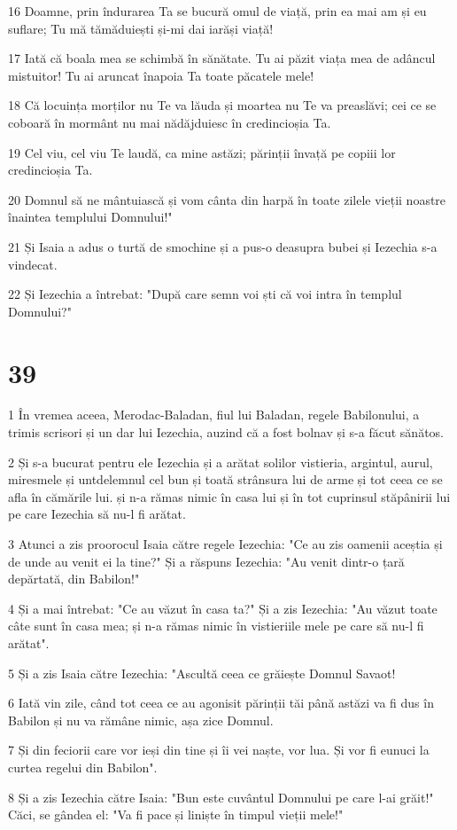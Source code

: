 \par 16 Doamne, prin îndurarea Ta se bucură omul de viață, prin ea mai am și eu suflare; Tu mă tămăduiești și-mi dai iarăși viață!
\par 17 Iată că boala mea se schimbă în sănătate. Tu ai păzit viața mea de adâncul mistuitor! Tu ai aruncat înapoia Ta toate păcatele mele!
\par 18 Că locuința morților nu Te va lăuda și moartea nu Te va preaslăvi; cei ce se coboară în mormânt nu mai nădăjduiesc în credincioșia Ta.
\par 19 Cel viu, cel viu Te laudă, ca mine astăzi; părinții învață pe copiii lor credincioșia Ta.
\par 20 Domnul să ne mântuiască și vom cânta din harpă în toate zilele vieții noastre înaintea templului Domnului!"
\par 21 Și Isaia a adus o turtă de smochine și a pus-o deasupra bubei și Iezechia s-a vindecat.
\par 22 Și Iezechia a întrebat: "După care semn voi ști că voi intra în templul Domnului?"

\chapter{39}

\par 1 În vremea aceea, Merodac-Baladan, fiul lui Baladan, regele Babilonului, a trimis scrisori și un dar lui Iezechia, auzind că a fost bolnav și s-a făcut sănătos.
\par 2 Și s-a bucurat pentru ele Iezechia și a arătat solilor vistieria, argintul, aurul, miresmele și untdelemnul cel bun și toată strânsura lui de arme și tot ceea ce se afla în cămările lui. și n-a rămas nimic în casa lui și în tot cuprinsul stăpânirii lui pe care Iezechia să nu-l fi arătat.
\par 3 Atunci a zis proorocul Isaia către regele Iezechia: "Ce au zis oamenii aceștia și de unde au venit ei la tine?" Și a răspuns Iezechia: "Au venit dintr-o țară depărtată, din Babilon!"
\par 4 Și a mai întrebat: "Ce au văzut în casa ta?" Și a zis Iezechia: "Au văzut toate câte sunt în casa mea; și n-a rămas nimic în vistieriile mele pe care să nu-l fi arătat".
\par 5 Și a zis Isaia către Iezechia: "Ascultă ceea ce grăiește Domnul Savaot!
\par 6 Iată vin zile, când tot ceea ce au agonisit părinții tăi până astăzi va fi dus în Babilon și nu va rămâne nimic, așa zice Domnul.
\par 7 Și din feciorii care vor ieși din tine și îi vei naște, vor lua. Și vor fi eunuci la curtea regelui din Babilon".
\par 8 Și a zis Iezechia către Isaia: "Bun este cuvântul Domnului pe care l-ai grăit!" Căci, se gândea el: "Va fi pace și liniște în timpul vieții mele!"

